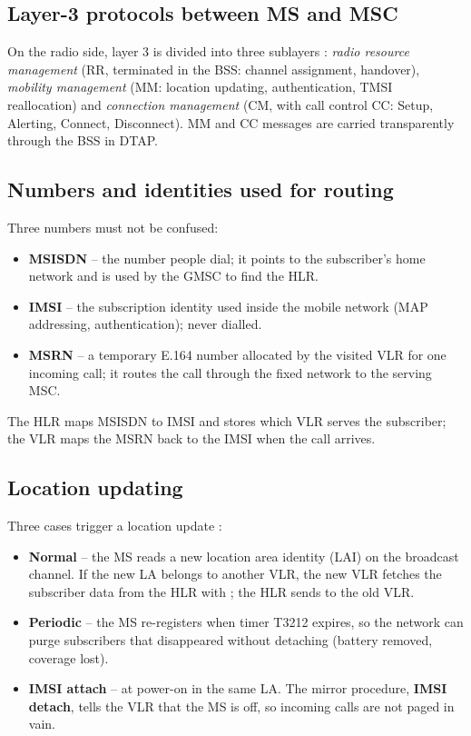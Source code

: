 \documentclass[11pt,a4paper]{article}
\begin{document}
\begin{acnfigure}
  \caption{SS7 stack in a GSM core network. MTP provides transport; ISUP controls trunk
  circuits; SCCP and TCAP support the MAP mobility dialogues and BSSAP on the A interface.}
  \label{fig:ss7}
\end{acnfigure}

\subsection{Layer-3 protocols between MS and MSC}
On the radio side, layer 3 is divided into three sublayers \cite{ts24008}: \emph{radio
resource management} (RR, terminated in the BSS: channel assignment, handover),
\emph{mobility management} (MM: location updating, authentication, TMSI reallocation) and
\emph{connection management} (CM, with call control CC: Setup, Alerting, Connect,
Disconnect). MM and CC messages are carried transparently through the BSS in DTAP.

\subsection{Numbers and identities used for routing}
Three numbers must not be confused:
\begin{itemize}
  \item \textbf{MSISDN} -- the number people dial; it points to the subscriber's home
        network and is used by the GMSC to find the HLR.
  \item \textbf{IMSI} -- the subscription identity used inside the mobile network (MAP
        addressing, authentication); never dialled.
  \item \textbf{MSRN} -- a temporary E.164 number allocated by the visited VLR for one
        incoming call; it routes the call through the fixed network to the serving MSC.
\end{itemize}
The HLR maps MSISDN to IMSI and stores which VLR serves the subscriber; the VLR maps the
MSRN back to the IMSI when the call arrives.

\subsection{Location updating}
Three cases trigger a location update \cite{ts23012}:
\begin{itemize}
  \item \textbf{Normal} -- the MS reads a new location area identity (LAI) on the broadcast
        channel. If the new LA belongs to another VLR, the new VLR fetches the subscriber
        data from the HLR with ; the HLR sends  to the
        old VLR.
  \item \textbf{Periodic} -- the MS re-registers when timer T3212 expires, so the network
        can purge subscribers that disappeared without detaching (battery removed, coverage lost).
  \item \textbf{IMSI attach} -- at power-on in the same LA. The mirror procedure,
        \textbf{IMSI detach}, tells the VLR that the MS is off, so incoming calls are not paged
        in vain.
\end{itemize}
\end{document}
